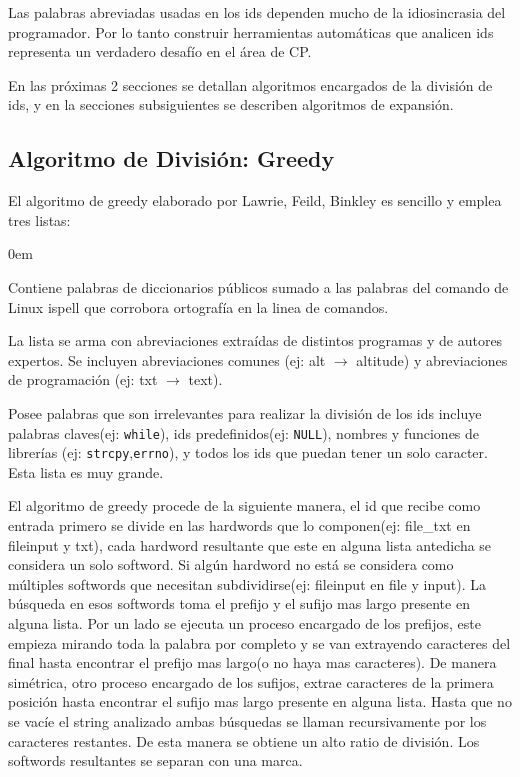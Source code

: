 \documentclass[12pt]{report}
\begin{document}
Las palabras abreviadas usadas en los ids dependen mucho de la idiosincrasia del programador. Por lo tanto construir herramientas automáticas que analicen ids representa un verdadero desafío en el área de CP.

En las próximas 2 secciones se detallan algoritmos encargados de la división de ids, y en la secciones subsiguientes se describen algoritmos de expansión.


\subsection{Algoritmo de División: Greedy}

El algoritmo de greedy elaborado por Lawrie, Feild, Binkley\cite{FBL06,LFBEX07} es sencillo y emplea tres listas:
\begin{description}
\itemsep0em%
\item[Palabras del diccionario:] Contiene palabras de diccionarios públicos sumado a las palabras del comando de Linux \textsf{ispell} que corrobora ortografía en la linea de comandos.

\item[Abreviaciones conocidas:] La lista se arma con abreviaciones extraídas de distintos programas y de autores expertos. Se incluyen abreviaciones comunes (ej: \textsf{alt} $\rightarrow$ \textsf{altitude}) y abreviaciones de programación (ej: \textsf{txt} $\rightarrow$ \textsf{text}).

\item[Palabras excluyentes(stop list):] Posee palabras que son irrelevantes para realizar la división de los ids incluye palabras claves(ej: \texttt{while}), ids predefinidos(ej: \texttt{NULL}), nombres y funciones de librerías (ej: \texttt{strcpy},\texttt{errno}), y todos los ids que puedan tener un solo caracter. Esta lista es muy grande.
\end{description}

El algoritmo de greedy procede de la siguiente manera, el id que recibe como entrada primero se divide en las hardwords que lo componen(ej: \textsf{file\_txt} en \textsf{fileinput} y \textsf{txt}), cada hardword resultante que este en alguna lista antedicha se considera un solo softword. Si algún hardword no está se considera como múltiples softwords que necesitan subdividirse(ej: \textsf{fileinput} en \textsf{file} y \textsf{input}). La búsqueda en esos softwords toma el prefijo y el sufijo mas largo presente en alguna lista. Por un lado se ejecuta un proceso encargado de los prefijos, este empieza mirando toda la palabra por completo y se van extrayendo caracteres del final hasta encontrar el prefijo mas largo(o no haya mas caracteres). De manera simétrica, otro proceso encargado de los sufijos, extrae caracteres de la primera posición hasta encontrar el sufijo mas largo presente en alguna lista. Hasta que no se vacíe el string analizado ambas búsquedas se llaman recursivamente por los caracteres restantes. De esta manera se obtiene un alto ratio de división. Los softwords resultantes se separan con una marca\cite{FBL06,LFBEX07}.
\end{document}
